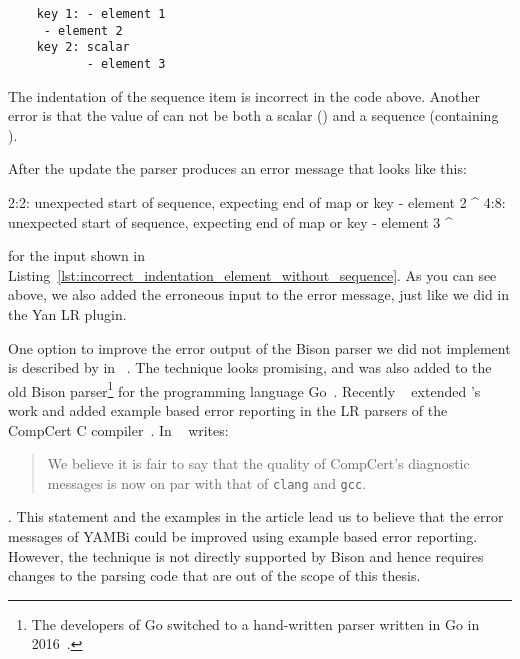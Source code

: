 \begin{listing}
  \begin{verbatim}
    key 1: - element 1
     - element 2
    key 2: scalar
           - element 3
  \end{verbatim}
  \caption{The indentation of the sequence item  is incorrect in the code above. Another error is that the value of  can not be both a scalar () and a sequence (containing ).}
  \label{lst:incorrect_indentation_element_without_sequence}
\end{listing}

After the update the parser produces an error message that looks like this:

\begin{textcode}
2:2: unexpected start of sequence, expecting end of map or key
      - element 2
      ^
4:8: unexpected start of sequence, expecting end of map or key
            - element 3
            ^
\end{textcode}

for the input shown in Listing~\ref{lst:incorrect_indentation_element_without_sequence}. As you can see above, we also added the erroneous input to the error message, just like we did in the Yan LR plugin.

One option to improve the error output of the Bison parser we did not implement is described by \citeauthor{jeffery2003generating} in ~\cite{jeffery2003generating}. The technique looks promising, and was also added to the old Bison parser\footnote{The developers of Go switched to a hand-written parser written in Go in 2016~\cite{pike2017reddit, go2016release}.} for the programming language Go~\cite{cox2010errors}. Recently \citeauthor{pottier2016reachability}~\cite{pottier2016reachability} extended \citeauthor{jeffery2003generating}’s work and added example based error reporting in the LR parsers of the CompCert C compiler~\cite{kaestner2018compcert}. In  \citeauthor{pottier2016reachability}~\cite{pottier2016reachability} writes:

\begin{quote}
  We believe it is fair to say that the quality of CompCert’s diagnostic messages is now on par with that of \texttt{clang} and \texttt{gcc}.
\end{quote}

. This statement and the examples in the article lead us to believe that the error messages of YAMBi could be improved using example based error reporting. However, the technique is not directly supported by Bison and hence requires changes to the parsing code that are out of the scope of this thesis.

